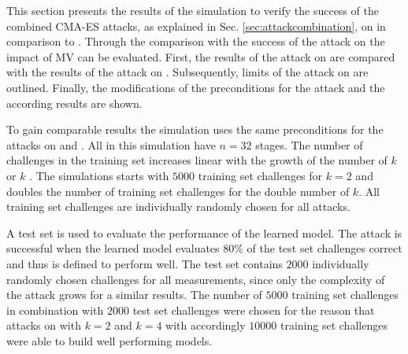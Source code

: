 This section presents the results of the simulation to verify the success of the combined \ac{CMA-ES} attacks, as explained in Sec. \ref{sec:attackcombination}, on \mxpufs in comparison to \xpufs.
Through the comparison with the success of the attack on \xpuf the impact of \ac{MV} can be evaluated.
First, the results of the attack on \xpufs are compared with the results of the attack on \mxpufs.
Subsequently, limits of the attack on \mxpufs are outlined.
Finally, the modifications of the preconditions for the attack and the according results are shown.

To gain comparable results the simulation uses the same preconditions for the attacks on \xpufs and \mxpufs.
All \pufs in this simulation have $n = 32$ stages.
The number of challenges in the training set increases linear with the growth of the number of $k$ \apufs or $k$ \mpufs.
The simulations starts with $5000$ training set challenges for $k = 2$ and doubles the number of training set challenges for the double number of $k$.
All training set challenges are individually randomly chosen for all attacks.

A test set is used to evaluate the performance of the learned model.
The attack is successful when the learned model evaluates $80 \%$ of the test set challenges correct and thus is defined to perform well.
The test set contains $2000$ individually randomly chosen challenges for all measurements, since only the complexity of the attack grows for a similar results.
The number of $5000$ training set challenges in combination with $2000$ test set challenges were chosen for the reason that attacks on \xpufs with $k = 2$ and $k = 4$ with accordingly $10000$ training set challenges were able to build well performing models.

